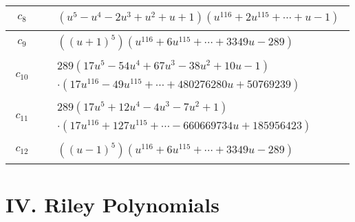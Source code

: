 \documentclass[1p]{elsarticle_modified}
\theoremstyle{definition}
\begin{document}
\begin{tabular}{m{50pt}|m{274pt}}
\hline $$\begin{aligned}c_{8}\end{aligned}$$&$\begin{aligned}
&(u^5- u^4-2 u^3+u^2+u+1)(u^{116}+2 u^{115}+\cdots+u-1)
\end{aligned}$\\
\hline $$\begin{aligned}c_{9}\end{aligned}$$&$\begin{aligned}
&((u+1)^5)(u^{116}+6 u^{115}+\cdots+3349 u-289)
\end{aligned}$\\
\hline $$\begin{aligned}c_{10}\end{aligned}$$&$\begin{aligned}
&289(17 u^5-54 u^4+67 u^3-38 u^2+10 u-1)\\
&\cdot(17 u^{116}-49 u^{115}+\cdots+480276280 u+50769239)
\end{aligned}$\\
\hline $$\begin{aligned}c_{11}\end{aligned}$$&$\begin{aligned}
&289(17 u^5+12 u^4-4 u^3-7 u^2+1)\\
&\cdot(17 u^{116}+127 u^{115}+\cdots-660669734 u+185956423)
\end{aligned}$\\
\hline $$\begin{aligned}c_{12}\end{aligned}$$&$\begin{aligned}
&((u-1)^5)(u^{116}+6 u^{115}+\cdots+3349 u-289)
\end{aligned}$\\
\hline
\end{tabular}\newpage\renewcommand{\arraystretch}{1}
\centering \section*{ IV. Riley Polynomials}
\end{document}
